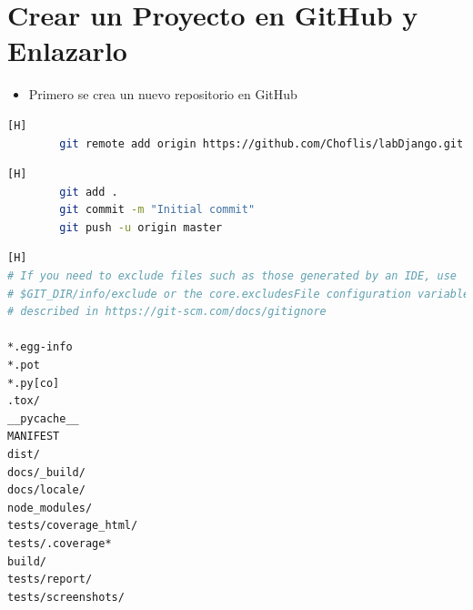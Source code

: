 \documentclass{article}
\begin{document}
\section{Crear un Proyecto en GitHub y Enlazarlo}
	\begin{itemize}
		\item Primero se crea un nuevo repositorio en GitHub
	\end{itemize}  
	\begin{lstlisting}[language=bash,caption={Enlazar el repositorio local con GitHub}][H]
		git remote add origin https://github.com/Choflis/labDjango.git
	\end{lstlisting}
	\begin{lstlisting}[language=bash,caption={Agregar archivos, hacer un commit inicial y hacer push al repositorio remoto}][H]
		git add .
		git commit -m "Initial commit"
		git push -u origin master
	\end{lstlisting}
	\begin{lstlisting}[language=bash,caption={Creando un archivo .gitignore según el repositorio dado}][H]
# If you need to exclude files such as those generated by an IDE, use
# $GIT_DIR/info/exclude or the core.excludesFile configuration variable as
# described in https://git-scm.com/docs/gitignore

*.egg-info
*.pot
*.py[co]
.tox/
__pycache__
MANIFEST
dist/
docs/_build/
docs/locale/
node_modules/
tests/coverage_html/
tests/.coverage*
build/
tests/report/
tests/screenshots/
	\end{lstlisting}
\end{document}
